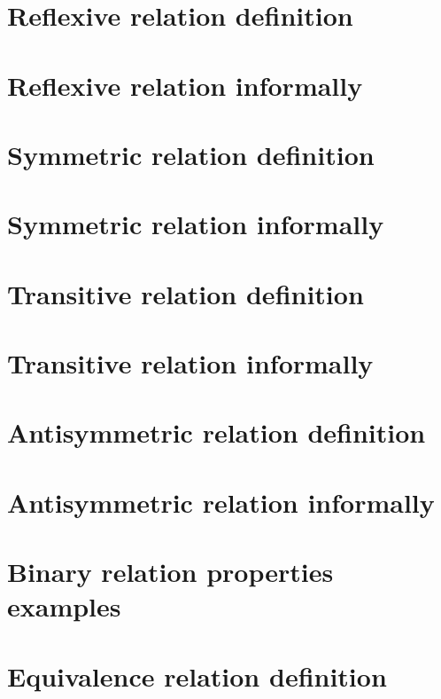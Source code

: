
\section*{Reflexive relation definition}

\vfill
\section*{Reflexive relation informally}

\vfill
\section*{Symmetric relation definition}

\vfill
\section*{Symmetric relation informally}

\vfill
\section*{Transitive relation definition}

\vfill
\section*{Transitive relation informally}

\vfill
\section*{Antisymmetric relation definition}

\vfill
\section*{Antisymmetric relation informally}

\vfill
\section*{Binary relation properties examples}

\vfill
\section*{Equivalence relation definition}

\vfill
